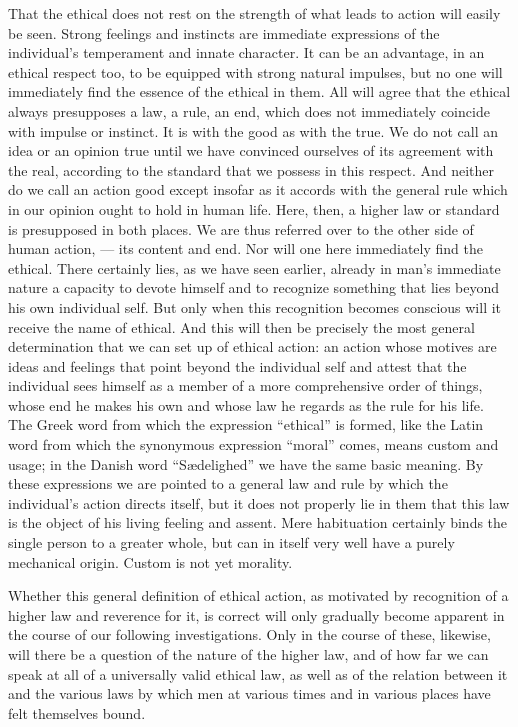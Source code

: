 \documentclass[12pt,a4paper,openany]{book}
\newcommand{\opage}[1]{\marginnote{\footnotesize\textit{[#1]}}}
\begin{document}
That the ethical does not rest on the strength of what leads to action
will easily be seen. Strong feelings and instincts are immediate
expressions of the individual's temperament and innate character. It
\opage{16}can be an advantage, in an ethical respect too, to be equipped
with strong natural impulses, but no one will immediately find the essence
of the ethical in them. All will agree that the ethical always presupposes
a law, a rule, an end, which does not immediately coincide with impulse or
instinct. It is with the good as with the true. We do not call an idea or
an opinion true until we have convinced ourselves of its agreement with the
real, according to the standard that we possess in this respect. And
neither do we call an action good except insofar as it accords with the
general rule which in our opinion ought to hold in human life. Here, then,
a higher law or standard is presupposed in both places. We are thus
referred over to the other side of human action, --- its content and end.
Nor will one here immediately find the ethical. There certainly lies, as we
have seen earlier, already in man's immediate nature a capacity to devote
himself and to recognize something that lies beyond his own individual
self. But only when this recognition becomes conscious will it receive the
name of ethical. And this will then be precisely the most general
determination that we can set up of %
ethical action: an action whose motives are ideas and feelings that point
beyond the individual self and attest that the individual sees himself as a
member of a more comprehensive order of things, whose end he makes his own
and whose law he regards as the rule for his life. The Greek word from
which \opage{17}the expression ``ethical'' is formed, like the Latin word
from which the synonymous expression ``moral'' comes, means custom and
usage; in the Danish word ``Sædelighed'' we have the same basic meaning. %
By these expressions we are pointed to a general law and rule by which the
individual's action directs itself, but it does not properly lie in them
that this law is the object of his living feeling and assent. Mere
habituation certainly binds the single person to a greater whole, but can
in itself very well have a purely mechanical origin. Custom is not yet
morality.

Whether this general definition of ethical action, as motivated by
recognition of a higher law and reverence for it, is correct will only
gradually become apparent in the course of our following investigations.
Only in the course of these, likewise, will there be a question of the
nature of the higher law, and of how far we can speak at all of a
universally valid ethical law, as well as of the relation between it and
the various laws by which men at various times and in various places have
felt themselves bound.
\end{document}
